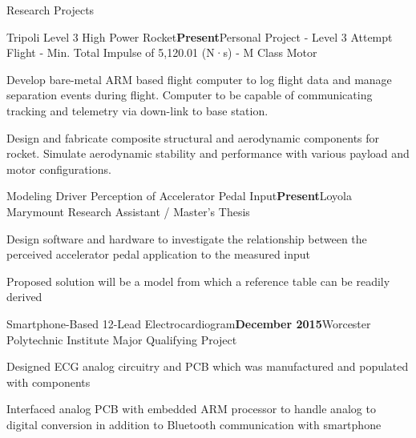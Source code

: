 \documentclass{resume} %
\begin{document}
	\begin{rSection}{Research Projects}
		
		\begin{rSubsection}{Tripoli Level 3 High Power Rocket}{\bf Present}{Personal Project - Level 3 Attempt Flight - Min. Total Impulse of 5,120.01 (N·s) - M Class Motor}{}
			\item  Develop bare-metal ARM based flight computer to log flight data and manage separation events during flight. Computer to be capable of communicating tracking and telemetry via down-link to base station. 
			\item Design and fabricate composite structural and aerodynamic components for rocket. Simulate aerodynamic stability and performance with various payload and motor configurations.
		\end{rSubsection}
		
		\begin{rSubsection}{Modeling Driver Perception of Accelerator Pedal Input}{\bf Present}{Loyola Marymount Research Assistant / Master's Thesis}{}
			\item Design software and hardware to investigate the relationship between the perceived accelerator pedal application to the measured input
			\item Proposed solution will be a model from which a reference table can be readily derived 
		\end{rSubsection}
		
		\begin{rSubsection}{Smartphone-Based 12-Lead Electrocardiogram}{\bf December 2015}{Worcester Polytechnic Institute Major Qualifying Project}{}
			\item Designed ECG analog circuitry and PCB which was manufactured and populated with components 
			\item Interfaced analog PCB with embedded ARM processor to handle analog to digital conversion in addition to Bluetooth communication with smartphone
		\end{rSubsection}
		
		
	\end{rSection}
	
\end{document}
